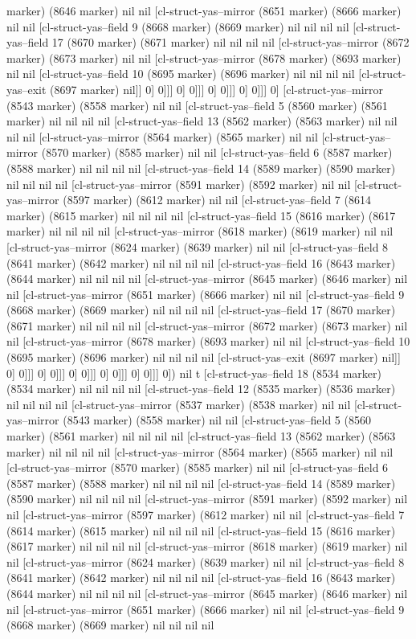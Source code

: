 {{marker) (8646 marker) nil nil [cl-struct-yas--mirror (8651 marker) (8666 marker) nil nil [cl-struct-yas--field 9 (8668 marker) (8669 marker) nil nil nil nil [cl-struct-yas--field 17 (8670 marker) (8671 marker) nil nil nil nil [cl-struct-yas--mirror (8672 marker) (8673 marker) nil nil [cl-struct-yas--mirror (8678 marker) (8693 marker) nil nil [cl-struct-yas--field 10 (8695 marker) (8696 marker) nil nil nil nil [cl-struct-yas--exit (8697 marker) nil]] 0] 0]]] 0] 0]]] 0] 0]]] 0] 0]]] 0] [cl-struct-yas--mirror (8543 marker) (8558 marker) nil nil [cl-struct-yas--field 5 (8560 marker) (8561 marker) nil nil nil nil [cl-struct-yas--field 13 (8562 marker) (8563 marker) nil nil nil nil [cl-struct-yas--mirror (8564 marker) (8565 marker) nil nil [cl-struct-yas--mirror (8570 marker) (8585 marker) nil nil [cl-struct-yas--field 6 (8587 marker) (8588 marker) nil nil nil nil [cl-struct-yas--field 14 (8589 marker) (8590 marker) nil nil nil nil [cl-struct-yas--mirror (8591 marker) (8592 marker) nil nil [cl-struct-yas--mirror (8597 marker) (8612 marker) nil nil [cl-struct-yas--field 7 (8614 marker) (8615 marker) nil nil nil nil [cl-struct-yas--field 15 (8616 marker) (8617 marker) nil nil nil nil [cl-struct-yas--mirror (8618 marker) (8619 marker) nil nil [cl-struct-yas--mirror (8624 marker) (8639 marker) nil nil [cl-struct-yas--field 8 (8641 marker) (8642 marker) nil nil nil nil [cl-struct-yas--field 16 (8643 marker) (8644 marker) nil nil nil nil [cl-struct-yas--mirror (8645 marker) (8646 marker) nil nil [cl-struct-yas--mirror (8651 marker) (8666 marker) nil nil [cl-struct-yas--field 9 (8668 marker) (8669 marker) nil nil nil nil [cl-struct-yas--field 17 (8670 marker) (8671 marker) nil nil nil nil [cl-struct-yas--mirror (8672 marker) (8673 marker) nil nil [cl-struct-yas--mirror (8678 marker) (8693 marker) nil nil [cl-struct-yas--field 10 (8695 marker) (8696 marker) nil nil nil nil [cl-struct-yas--exit (8697 marker) nil]] 0] 0]]] 0] 0]]] 0] 0]]] 0] 0]]] 0] 0]]] 0]) nil t [cl-struct-yas--field 18 (8534 marker) (8534 marker) nil nil nil nil [cl-struct-yas--field 12 (8535 marker) (8536 marker) nil nil nil nil [cl-struct-yas--mirror (8537 marker) (8538 marker) nil nil [cl-struct-yas--mirror (8543 marker) (8558 marker) nil nil [cl-struct-yas--field 5 (8560 marker) (8561 marker) nil nil nil nil [cl-struct-yas--field 13 (8562 marker) (8563 marker) nil nil nil nil [cl-struct-yas--mirror (8564 marker) (8565 marker) nil nil [cl-struct-yas--mirror (8570 marker) (8585 marker) nil nil [cl-struct-yas--field 6 (8587 marker) (8588 marker) nil nil nil nil [cl-struct-yas--field 14 (8589 marker) (8590 marker) nil nil nil nil [cl-struct-yas--mirror (8591 marker) (8592 marker) nil nil [cl-struct-yas--mirror (8597 marker) (8612 marker) nil nil [cl-struct-yas--field 7 (8614 marker) (8615 marker) nil nil nil nil [cl-struct-yas--field 15 (8616 marker) (8617 marker) nil nil nil nil [cl-struct-yas--mirror (8618 marker) (8619 marker) nil nil [cl-struct-yas--mirror (8624 marker) (8639 marker) nil nil [cl-struct-yas--field 8 (8641 marker) (8642 marker) nil nil nil nil [cl-struct-yas--field 16 (8643 marker) (8644 marker) nil nil nil nil [cl-struct-yas--mirror (8645 marker) (8646 marker) nil nil [cl-struct-yas--mirror (8651 marker) (8666 marker) nil nil [cl-struct-yas--field 9 (8668 marker) (8669 marker) nil nil nil nil }}
